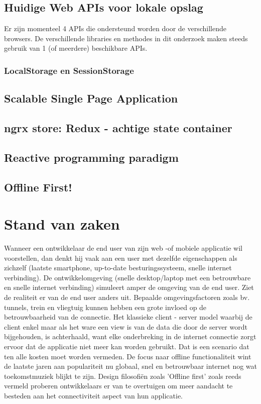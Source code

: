 \subsection{Huidige Web APIs voor lokale opslag}
Er zijn momenteel 4 APIs die ondersteund worden door de verschillende browsers. De verschillende libraries en methodes in dit onderzoek maken steeds gebruik van 1 (of meerdere) beschikbare APIs.
\subsubsection{LocalStorage en SessionStorage}
\subsection{Scalable Single Page Application}
\subsection{ngrx store: Redux - achtige state container}
\subsection{Reactive programming paradigm}
\subsection{Offline First!}
\section{Stand van zaken}
\label{sec:stand-van-zaken}
Wanneer een ontwikkelaar de end user van zijn web -of mobiele applicatie wil voorstellen, dan denkt hij vaak aan een user met dezelfde eigenschappen als zichzelf (laatste smartphone, up-to-date besturingssysteem,  snelle internet verbinding). De ontwikkelomgeving (snelle desktop/laptop met een betrouwbare en snelle internet verbinding) simuleert amper de omgeving van de end user. Ziet de realiteit er van de end user anders uit. Bepaalde omgevingsfactoren zoals bv. tunnels, trein en vliegtuig kunnen hebben een grote invloed op de betrouwbaarheid van de connectie. Het klassieke client - server model waarbij de client enkel maar als het ware een view is van de data die door de server wordt bijgehouden, is achterhaald, want elke onderbreking in de internet connectie zorgt ervoor dat de applicatie niet meer kan worden gebruikt. Dat is een scenario dat ten alle kosten moet worden vermeden.
De focus naar offline functionaliteit wint de laatste jaren aan populariteit nu globaal, snel en betrouwbaar internet nog wat toekomstmuziek blijkt te zijn. Design filosofi\"en zoals 'Offline first' zoals reeds vermeld proberen ontwikkelaars er van te overtuigen om meer aandacht te besteden aan het connectiviteit aspect van hun applicatie.
